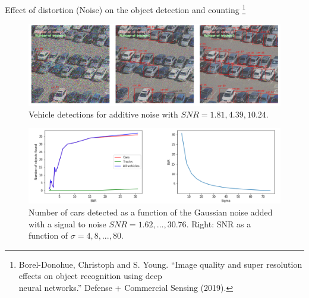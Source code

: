 \documentclass{libs/ufc_format}
\begin{document}
\begin{frame}{\small Effect of distortion (Noise) on the object detection and counting \footnote[frame]{\tiny Borel-Donohue, Christoph and S. Young. “Image quality and super resolution effects on object recognition using deep \\ neural networks.” Defense + Commercial Sensing (2019).}}
    \begin{figure}
        \centering
        \includegraphics[scale=0.15]{libs/noiseeffect.png}
        \caption{Vehicle detections for additive noise with $SNR = {1.81, 4.39, 10.24}$.}
        \label{fig:challengenoise}
    \end{figure}

    \begin{figure}
        \centering
        \includegraphics[scale=0.15]{libs/noiseeffect2.png}
        \caption{Number of cars detected as a function of the Gaussian noise added with a signal to noise $SNR = {1.62,..., 30.76}$. Right: SNR as a function of $\sigma = {4, 8,..., 80}$.}
        \label{fig:challengenoise2}
    \end{figure}

\end{frame}
\end{document}
